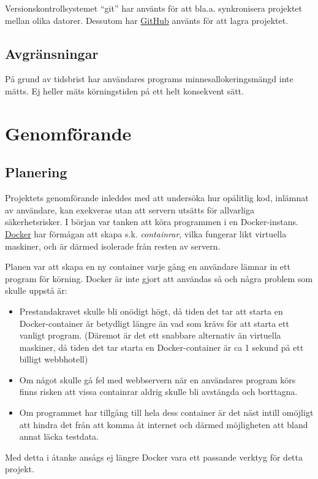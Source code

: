 \documentclass{article}
\begin{document}
Versionskontrollsystemet ``git'' har använts för att bla.a. synkronisera
projektet mellan olika datorer. Dessutom har \href{https://github.com/}{GitHub}
använts för att lagra projektet.


\subsection{Avgränsningar}

På grund av tidsbrist har användares programs minnesallokeringsmängd inte mätts.
Ej heller mäts körningstiden på ett helt konsekvent sätt.

\section{Genomförande}

\subsection{Planering}

Projektets genomförande inleddes med att undersöka hur opålitlig kod, inlämnat
av användare, kan exekveras utan att servern utsätts för allvarliga
säkerhetsrisker. I början var tanken att köra programmen i en Docker-instans.
\href{https://www.docker.com}{Docker} har förmågan att skapa s.k.
\textit{containrar}, vilka fungerar likt virtuella maskiner, och är därmed
isolerade från resten av servern.

Planen var att skapa en ny container varje gång en användare lämnar in ett
program för körning. Docker är inte gjort att användas så och några problem som
skulle uppstå är:
\begin{itemize}
	\item Prestandakravet skulle bli onödigt högt, då tiden det tar att starta
		en Docker-container är betydligt längre än vad som krävs för att starta
		ett vanligt program. (Däremot är det ett snabbare alternativ än
		virtuella maskiner, då tiden det tar starta en Docker-container är ca
		1 sekund på ett billigt webbhotell)
	\item Om något skulle gå fel med webbservern när en användares program körs
		finns risken att vissa containrar aldrig skulle bli avstängda och
		borttagna.
	\item Om programmet har tillgång till hela dess container är det näst
		intill omöjligt att hindra det från att komma åt internet och därmed
		möjligheten att bland annat läcka testdata.
\end{itemize}
Med detta i åtanke ansågs ej längre Docker vara ett passande verktyg för detta
projekt.
\end{document}
